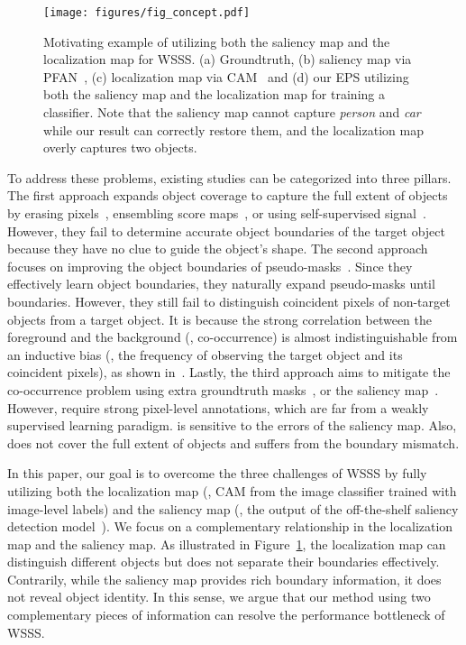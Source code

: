 \documentclass[final]{cvpr}
\begin{document}
\begin{figure}[t]
\centering
\texttt{[image: figures/fig\_concept.pdf]}
\caption{Motivating example of utilizing both the saliency map and the localization map for WSSS. (a) Groundtruth, (b) saliency map via PFAN~\cite{zhao2019pyramid}, (c) localization map via CAM~\cite{zhou2016learning} and (d) our EPS utilizing both the saliency map and the localization map for training a classifier. Note that the saliency map cannot capture \emph{person} and \emph{car} while our result can correctly restore them, and the localization map overly captures two objects.} \vspace{-2mm}
\label{fig:concept}
\end{figure} 
To address these problems, existing studies can be categorized into three pillars. The first approach expands object coverage to capture the full extent of objects by erasing pixels~\cite{choe2020attention,kim2017two, li2018tell}, ensembling score maps~\cite{jiang2019integral, lee2019ficklenet}, or using self-supervised signal~\cite{wang2020self}. However, they fail to determine accurate object boundaries of the target object because they have no clue to guide the object's shape. The second approach focuses on improving the object boundaries of pseudo-masks~\cite{fan2020learning,chen2020boundary}. Since they effectively learn object boundaries, they naturally expand pseudo-masks until boundaries. However, they still fail to distinguish coincident pixels of non-target objects from a target object. It is because the strong correlation between the foreground and the background (\ie, co-occurrence) is almost indistinguishable from an inductive bias (\ie, the frequency of observing the target object and its coincident pixels), as shown in~\cite{choe2020evaluating}. Lastly, the third approach aims to mitigate the co-occurrence problem using extra groundtruth masks~\cite{BMVC2016_92}, or the saliency map~\cite{oh2017exploiting, yao2020saliency}. However, \cite{BMVC2016_92,li2018tell} require strong pixel-level annotations, which are far from a weakly supervised learning paradigm. \cite{oh2017exploiting} is sensitive to the errors of the saliency map. Also, \cite{yao2020saliency} does not cover the full extent of objects and suffers from the boundary mismatch.


In this paper, our goal is to overcome the three challenges of WSSS by fully utilizing both the localization map (\ie, CAM from the image classifier trained with image-level labels) and the saliency map (\ie, the output of the off-the-shelf saliency detection model~\cite{hou2017deeply,nguyen2019deepusps,zhao2019pyramid}). We focus on a complementary relationship in the localization map and the saliency map. As illustrated in Figure~\ref{fig:concept}, the localization map can distinguish different objects but does not separate their boundaries effectively. Contrarily, while the saliency map provides rich boundary information, it does not reveal object identity. In this sense, we argue that our method using two complementary pieces of information can resolve the performance bottleneck of WSSS.
\end{document}
